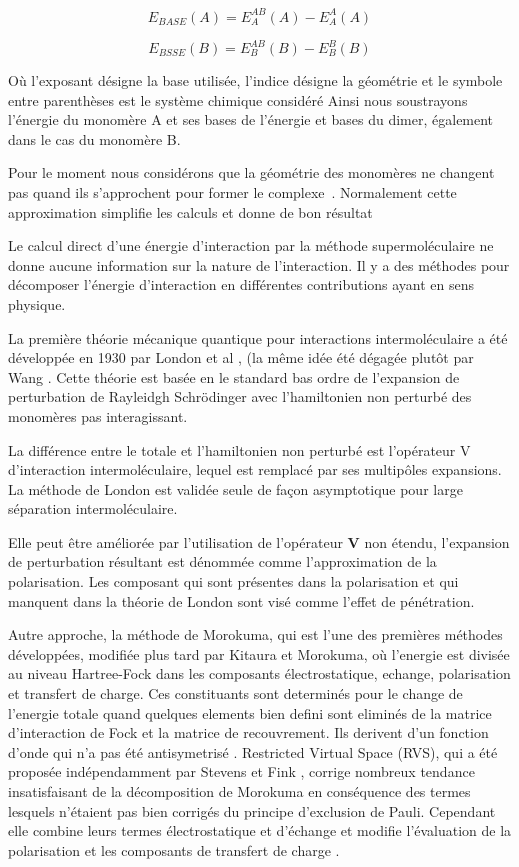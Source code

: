 \begin{equation}
E_{BASE}(A) = E_{A}^{AB}(A) - E_{A}^{A}(A)
\end{equation}

\begin{equation}
E_{BSSE}(B) = E_{B}^{AB}(B) - E_{B}^{B}(B)
\end{equation}

Où l'exposant désigne la base utilisée, l'indice désigne la géométrie et le symbole entre parenthèses est le système chimique considéré Ainsi nous soustrayons l'énergie du monomère A et ses bases de l'énergie et bases du dimer, également dans le cas du monomère B. 

Pour le moment nous considérons que la géométrie des monomères ne changent pas quand ils s'approchent pour former le complexe . Normalement cette approximation simplifie les calculs et donne de bon résultat 

Le calcul direct d’une énergie d’interaction par la méthode supermoléculaire ne donne aucune information sur la nature de l’interaction. Il y a des méthodes pour décomposer l’énergie d’interaction en différentes contributions ayant en sens physique. 

La première théorie mécanique quantique pour interactions intermoléculaire a été développée en 1930 par London et al \cite{london1930z}, (la même idée été dégagée plutôt par Wang \cite{wang1927mutual}. Cette théorie est basée en le standard bas ordre de l’expansion  de perturbation de Rayleidgh Schrödinger avec l’hamiltonien non perturbé des monomères pas interagissant. 

La différence entre le totale et l’hamiltonien non perturbé est l’opérateur V d’interaction intermoléculaire, lequel est remplacé par ses multipôles expansions. La méthode de London est validée seule de façon asymptotique pour large séparation intermoléculaire.

Elle peut être améliorée par l’utilisation de l’opérateur \textbf{V} non étendu, l’expansion de perturbation résultant est  dénommée comme l’approximation de la polarisation. Les composant qui sont présentes dans la polarisation et qui manquent dans la théorie de London sont visé comme l’effet de pénétration.  

Autre approche, la méthode de Morokuma, qui est l’une des premières méthodes développées, modifiée plus tard par Kitaura et Morokuma, où l'energie est divisée au niveau Hartree-Fock dans les composants  électrostatique, echange, polarisation et transfert de charge. Ces constituants sont determinés pour le change de l'energie totale quand quelques elements bien defini sont eliminés de la matrice d'interaction de Fock et la matrice de recouvrement. Ils derivent d'un fonction d'onde  qui n'a pas été antisymetrisé \cite{morokuma1977molecules}. Restricted Virtual Space (RVS), qui a été proposée indépendamment par Stevens et Fink \cite{stevens1987frozen}, corrige nombreux tendance insatisfaisant de la décomposition de Morokuma en conséquence des termes lesquels n’étaient pas bien corrigés du principe d’exclusion de Pauli. Cependant elle combine leurs termes électrostatique et d’échange et modifie l’évaluation de la polarisation et les composants de transfert de charge \cite{chen1996energy}.

